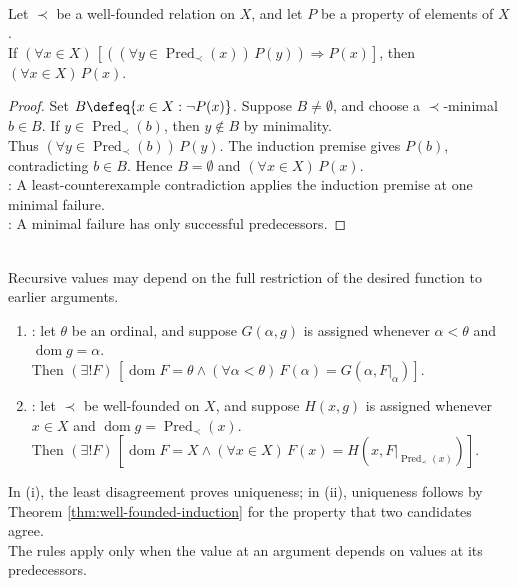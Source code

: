 \begin{theorem} \label{thm:well-founded-induction} \\
Let $\prec$ be a well-founded relation on $X$, and let $P$ be a property of elements of $X$.\\
If $(\forall x\in X)\,[((\forall y\in\operatorname{Pred}_{\prec}(x))\,P(y))\Rightarrow P(x)]$, then $(\forall x\in X)\,P(x)$.
\begin{proof}
Set $B\defeq\{x\in X:\neg P(x)\}$. Suppose $B\neq\emptyset$, and choose a $\prec$-minimal $b\in B$. If $y\in\operatorname{Pred}_{\prec}(b)$, then $y\notin B$ by minimality.\\
Thus $(\forall y\in\operatorname{Pred}_{\prec}(b))\,P(y)$. The induction premise gives $P(b)$, contradicting $b\in B$. Hence $B=\emptyset$ and $(\forall x\in X)\,P(x)$.\\
: A least-counterexample contradiction applies the induction premise at one minimal failure.\\
: A minimal failure has only successful predecessors.
\end{proof}
\end{theorem}

\begin{principle} \label{princ:transfinite-and-well-founded-recursion} \\
Recursive values may depend on the full restriction of the desired function to earlier arguments.
\begin{enumerate}[label=(\roman*)]
\setlength{\itemsep}{0pt}
\item {}: let $\theta$ be an ordinal, and suppose $G(\alpha,g)$ is assigned whenever $\alpha<\theta$ and $\operatorname{dom}g=\alpha$.\\
Then $(\exists!F)\,[\operatorname{dom}F=\theta\land(\forall\alpha<\theta)\,F(\alpha)=G(\alpha,F|_{\alpha})]$.
\item {}: let $\prec$ be well-founded on $X$, and suppose $H(x,g)$ is assigned whenever $x\in X$ and $\operatorname{dom}g=\operatorname{Pred}_{\prec}(x)$.\\
Then $(\exists!F)\,[\operatorname{dom}F=X\land(\forall x\in X)\,F(x)=H(x,F|_{\operatorname{Pred}_{\prec}(x)})]$.
\end{enumerate}
In (i), the least disagreement proves uniqueness; in (ii), uniqueness follows by Theorem \ref{thm:well-founded-induction} for the property that two candidates agree.\\
The rules apply only when the value at an argument depends on values at its predecessors.
\end{principle}

